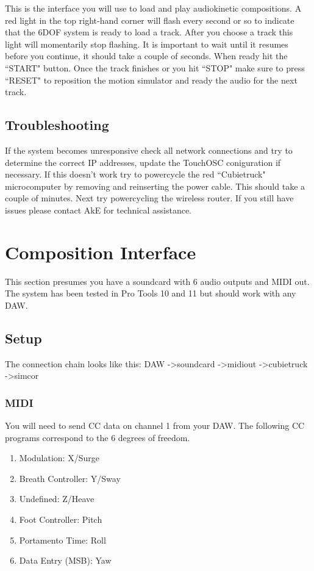 \documentclass{article}
\begin{document}
	This is the interface you will use to load and play audiokinetic 
	compositions. A red light in the top right-hand corner will flash every 
	second or so to indicate that the 6DOF system is ready to load a track. 
	After you choose a track this light will momentarily stop flashing. It is 
	important to wait until it resumes before you continue, it should take a 
	couple of seconds. When ready hit the ``START" button. Once the track 
	finishes or you hit ``STOP" make sure to press ``RESET" to reposition the 
	motion simulator and ready the audio for the next track.

	\subsection{Troubleshooting}
	If the system becomes unresponsive check all network connections and try to 
	determine the correct IP addresses, update the TouchOSC coniguration if 
	necessary. If this doesn't work try to powercycle the red ``Cubietruck" 
	microcomputer by removing and reinserting the power cable. This should take 
	a couple of minutes. Next try powercycling the wireless router. If you 
	still have issues please contact AkE for technical assistance.

	\section{Composition Interface}
	\label{comp}
	This section presumes you have a soundcard with 6 audio outputs and MIDI 
	out. The system has been tested in Pro Tools 10 and 11 but should work with
	any DAW.

	\subsection{Setup}
	The connection chain looks like this: \newline
	DAW -\textgreater soundcard -\textgreater midiout -\textgreater cubietruck 
	-\textgreater simcor \smallskip

	\subsubsection{MIDI}
	You will need to send CC data on channel 1 from your DAW. The following CC
	programs correspond to the 6 degrees of freedom.

	\begin{enumerate}
		\item  Modulation: X/Surge
		\item  Breath Controller: Y/Sway
		\item  Undefined: Z/Heave
		\item  Foot Controller: Pitch
		\item  Portamento Time: Roll
		\item  Data Entry (MSB): Yaw
	\end{enumerate}
\end{document}
